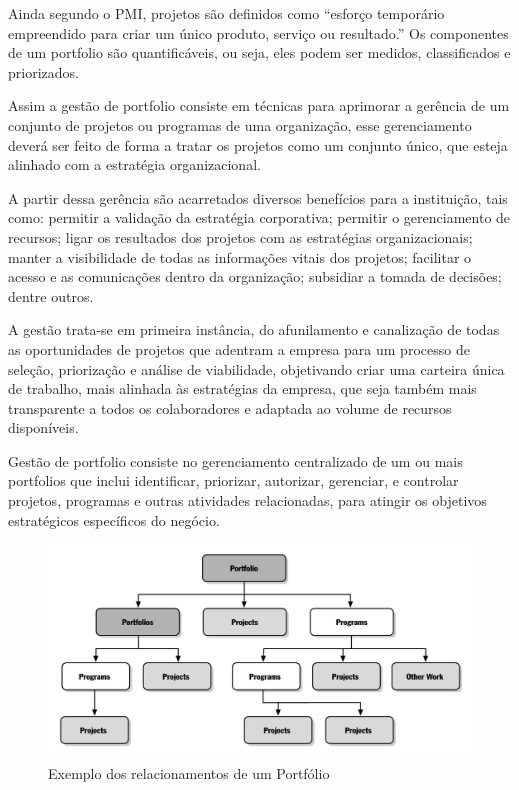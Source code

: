 \documentclass[12pt,a4paper,ruledheader,tocpage=prefix,floatnumber=continuous,pagestart=folhaderosto,font=times]{abnt}
\begin{document}
Ainda segundo o PMI, projetos são definidos como ``esforço temporário empreendido para criar um único produto, serviço ou resultado.'' Os componentes de 
um portfolio são quantificáveis, ou seja, eles podem ser medidos, classificados e priorizados.\cite{sppm}

Assim a gestão de portfolio consiste em técnicas para aprimorar a gerência de um conjunto de projetos ou programas de uma organização, esse gerenciamento
deverá ser feito de forma a tratar os projetos como um conjunto único, que esteja alinhado com a estratégia organizacional. 

A partir dessa gerência são acarretados diversos  benefícios para a instituição, tais como: permitir a validação da estratégia corporativa; 
permitir o gerenciamento de recursos; ligar os resultados dos projetos com as estratégias organizacionais; manter a visibilidade de todas as 
informações vitais dos projetos; facilitar o acesso e as comunicações dentro da organização; subsidiar a tomada de decisões; dentre outros. 

A gestão trata-se em primeira instância, do afunilamento e canalização de todas as oportunidades de projetos que adentram a empresa para um processo de 
seleção, priorização e análise de viabilidade, objetivando criar uma carteira única de trabalho, mais alinhada às estratégias da empresa, que seja 
também mais transparente a todos os colaboradores e adaptada ao volume de recursos disponíveis.

Gestão de portfolio consiste no gerenciamento centralizado de um ou mais portfolios  que inclui identificar, priorizar, autorizar, gerenciar, e 
controlar projetos, programas e outras atividades relacionadas, para atingir os objetivos estratégicos específicos do negócio.\cite{mps}

\begin{figure}[H]
\centering
\includegraphics[width=.9\textwidth]{flow_sppm.jpg}
\caption{Exemplo dos relacionamentos de um Portfólio}
\end{figure} 
\end{document}
